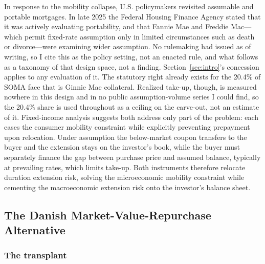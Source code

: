 \documentclass[12pt]{article}
\begin{document}
In response to the mobility collapse, U.S. policymakers revisited assumable and portable mortgages. In late 2025 the Federal Housing Finance Agency stated that it was actively evaluating portability, and that Fannie Mae and Freddie Mac---which permit fixed-rate assumption only in limited circumstances such as death or divorce---were examining wider assumption. No rulemaking had issued as of writing, so I cite this as the policy setting, not an enacted rule, and what follows as a taxonomy of that design space, not a finding. Section~\ref{sec:intro}'s concession applies to any evaluation of it. The statutory right already exists for the 20.4\% of SOMA face that is Ginnie Mae collateral. Realized take-up, though, is measured nowhere in this design and in no public assumption-volume series I could find, so the 20.4\% share is used throughout as a ceiling on the carve-out, not an estimate of it. Fixed-income analysis suggests both address only part of the problem: each eases the consumer mobility constraint while explicitly preventing prepayment upon relocation. Under assumption the below-market coupon transfers to the buyer and the extension stays on the investor's book, while the buyer must separately finance the gap between purchase price and assumed balance, typically at prevailing rates, which limits take-up. Both instruments therefore relocate duration extension risk, solving the microeconomic mobility constraint while cementing the macroeconomic extension risk onto the investor's balance sheet.

\subsection{The Danish Market-Value-Repurchase Alternative}\label{sec:abm-danish}

\subsubsection{The transplant}
\end{document}
